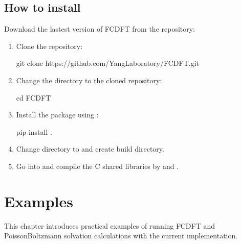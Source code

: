 \documentclass[letterpaper,10pt,english]{sphinxmanual}
\begin{document}
\section{How to install}
\label{\detokenize{install:how-to-install}}
\sphinxAtStartPar
Download the lastest version of FC\sphinxhyphen{}DFT from the repository:
\begin{enumerate}
%
\item {} 
\sphinxAtStartPar
Clone the repository:

\begin{sphinxVerbatim}[commandchars=\\\{\}]
\PYGZdl{} git clone https://github.com/Yang\PYGZhy{}Laboratory/FC\PYGZhy{}DFT.git
\end{sphinxVerbatim}

\item {} 
\sphinxAtStartPar
Change the directory to the cloned repository:

\begin{sphinxVerbatim}[commandchars=\\\{\}]
\PYGZdl{} cd FC\PYGZhy{}DFT
\end{sphinxVerbatim}

\item {} 
\sphinxAtStartPar
Install the package using :

\begin{sphinxVerbatim}[commandchars=\\\{\}]
\PYGZdl{} pip install .
\end{sphinxVerbatim}

\item {} 
\sphinxAtStartPar
Change directory to  and create build directory.

\item {} 
\sphinxAtStartPar
Go into  and compile the C shared libraries by  and .

\end{enumerate}

\sphinxstepscope


\chapter{Examples}
\label{\detokenize{examples:examples}}\label{\detokenize{examples::doc}}
\sphinxAtStartPar
This chapter introduces practical examples of running FC\sphinxhyphen{}DFT and Poisson\sphinxhyphen{}Boltzmann solvation calculations with the current implementation.
\end{document}
